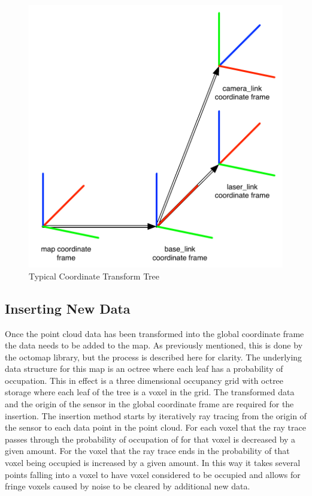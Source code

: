 \documentclass[12pt]{report}
\begin{document}
\begin{figure}[ht]
  \centering
  \includegraphics[width=5in,keepaspectratio]{transforms.pdf}
  \caption{Typical Coordinate Transform Tree}
  \label{fig:transforms}
\end{figure}

\subsection{Inserting New Data}
Once the point cloud data has been transformed into the global coordinate frame the data needs to be added to the map. As previously mentioned, this is done by the octomap library, but the process is described here for clarity. The underlying data structure for this map is an octree where each leaf has a probability of occupation. This in effect is a three dimensional occupancy grid with octree storage where each leaf of the tree is a voxel in the grid. The transformed data and the origin of the sensor in the global coordinate frame are required for the insertion. The insertion method starts by iteratively ray tracing from the origin of the sensor to each data point in the point cloud.  For each voxel that the ray trace passes through the probability of occupation of for that voxel is decreased by a given amount. For the voxel that the ray trace ends in the probability of that voxel being occupied is increased by a given amount. In this way it takes several points falling into a voxel to have voxel considered to be occupied and allows for fringe voxels caused by noise to be cleared by additional new data.
\end{document}
